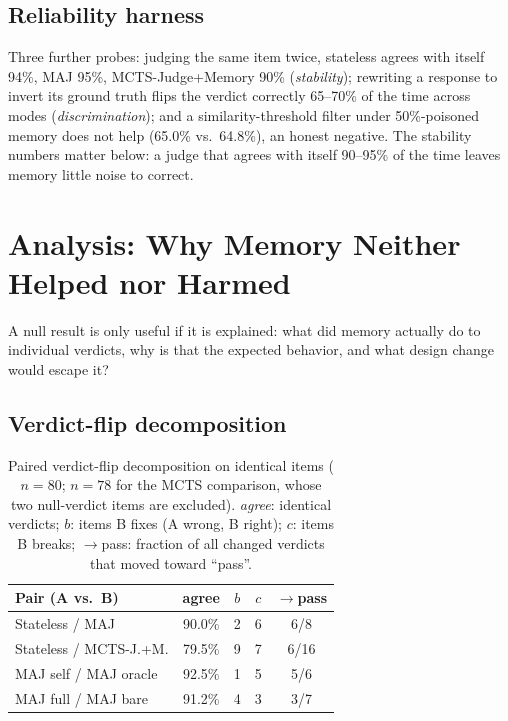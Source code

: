 \documentclass[]{ceurart}
\begin{document}
\subsection{Reliability harness}

Three further probes: judging the same item twice, stateless agrees with itself 94\%, MAJ 95\%, MCTS-Judge+Memory 90\% (\emph{stability}); rewriting a response to invert its ground truth flips the verdict correctly 65--70\% of the time across modes (\emph{discrimination}); and a similarity-threshold filter under 50\%-poisoned memory does not help (65.0\% vs.\ 64.8\%), an honest negative. The stability numbers matter below: a judge that agrees with itself 90--95\% of the time leaves memory little noise to correct.

\section{Analysis: Why Memory Neither Helped nor Harmed}
\label{sec:analysis}

A null result is only useful if it is explained: what did memory actually do to individual verdicts, why is that the expected behavior, and what design change would escape it?

\subsection{Verdict-flip decomposition}
\label{sec:flips}

\begin{table}[t]
\centering
\small
\caption{Paired verdict-flip decomposition on identical items ($n{=}80$; $n{=}78$ for the MCTS comparison, whose two null-verdict items are excluded). \emph{agree}: identical verdicts; $b$: items B fixes (A wrong, B right); $c$: items B breaks; $\to$pass: fraction of all changed verdicts that moved toward ``pass''.}
\label{tab:flips}
\begin{tabular}{lcccc}
\toprule
Pair (A vs.\ B) & agree & $b$ & $c$ & $\to$pass \\
\midrule
Stateless / MAJ & 90.0\% & 2 & 6 & 6/8 \\
Stateless / MCTS-J.+M. & 79.5\% & 9 & 7 & 6/16 \\
MAJ self / MAJ oracle & 92.5\% & 1 & 5 & 5/6 \\
MAJ full / MAJ bare & 91.2\% & 4 & 3 & 3/7 \\
\bottomrule
\end{tabular}

\end{table}
\end{document}
